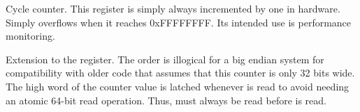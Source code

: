 

Cycle counter. This register is simply always incremented by one in hardware.
Simply overflows when it reaches 0xFFFFFFFF. Its intended use is performance
monitoring.



Extension to the  register. The order is illogical for a big endian 
system for compatibility with older code that assumes that this counter is only 
32 bits wide. The high word of the counter value is latched whenever  
is read to avoid needing an atomic 64-bit read operation. Thus,  must 
always be read before  is read.


